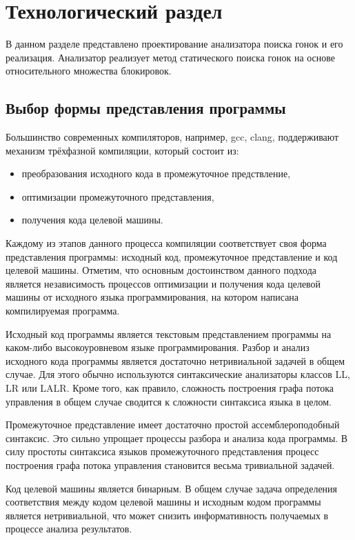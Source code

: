 \chapter{Технологический раздел}
\label{cha:impl}

В данном разделе представлено проектирование анализатора поиска гонок и его реализация. Анализатор реализует метод статического поиска гонок на основе относительного множества блокировок.

\section{Выбор формы представления программы}

Большинство современных компиляторов, например, gcc, clang, поддерживают механизм трёхфазной компиляции, который состоит из:
\begin{itemize}
  \item преобразования исходного кода в промежуточное предствление,
  \item оптимизации промежуточного представления,
  \item получения кода целевой машины.
\end{itemize}
Каждому из этапов данного процесса компиляции соответствует своя форма представления программы: исходный код, промежуточное представление и код целевой машины. Отметим, что основным достоинством данного подхода является независимость процессов оптимизации и получения кода целевой машины от исходного языка программирования, на котором написана компилируемая программа. 

Исходный код программы является текстовым представлением программы на каком-либо высокоуровневом языке программирования. Разбор и анализ исходного кода программы является достаточно нетривиальной задачей в общем случае. Для этого обычно используются синтаксические анализаторы классов LL, LR или LALR. Кроме того, как правило, сложность построения графа потока управления в общем случае сводится к сложности синтаксиса языка в целом.

Промежуточное представление имеет достаточно простой ассемблероподобный синтаксис. Это сильно упрощает процессы разбора и анализа кода программы. В силу простоты синтаксиса языков промежуточного представления процесс построения графа потока управления становится весьма тривиальной задачей.

Код целевой машины является бинарным. В общем случае задача определения соответствия между кодом целевой машины и исходным кодом программы является нетривиальной, что может снизить информативность получаемых в процессе анализа результатов.

